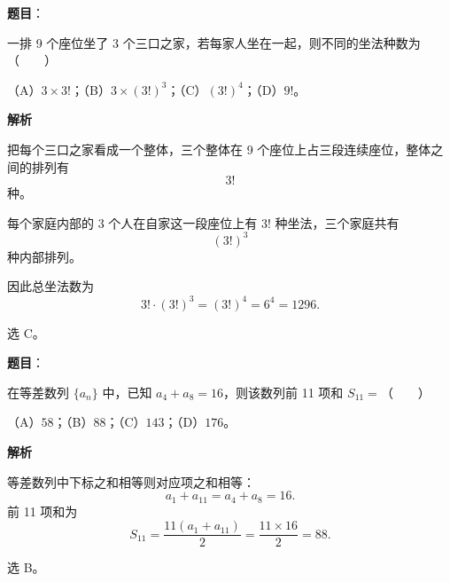 \begin{answer}

\textbf{题目}：

一排 9 个座位坐了 3 个三口之家，若每家人坐在一起，则不同的坐法种数为\mbox{（　　）}

（A）$3\times3!$；（B）$3\times(3!)^3$；（C）$(3!)^4$；（D）$9!$。

\textbf{解析}

把每个三口之家看成一个整体，三个整体在 9 个座位上占三段连续座位，整体之间的排列有
\nopagebreak[4]
\[3!\]
种。

每个家庭内部的 3 个人在自家这一段座位上有 $3!$ 种坐法，三个家庭共有
\nopagebreak[4]
\[(3!)^3\]
种内部排列。

因此总坐法数为
\nopagebreak[4]
\[3!\cdot(3!)^3=(3!)^4=6^4=1296.\]

选 C。


\end{answer}
\begin{answer}

\textbf{题目}：

在等差数列 $\{a_n\}$ 中，已知 $a_4+a_8=16$，则该数列前 11 项和 $S_{11}=$\mbox{（　　）}

（A）$58$；（B）$88$；（C）$143$；（D）$176$。

\textbf{解析}

等差数列中下标之和相等则对应项之和相等：
\nopagebreak[4]
\[a_1+a_{11}=a_4+a_8=16.\]
前 11 项和为
\nopagebreak[4]
\[S_{11}=\frac{11(a_1+a_{11})}{2}=\frac{11\times16}{2}=88.\]

选 B。


\end{answer}
